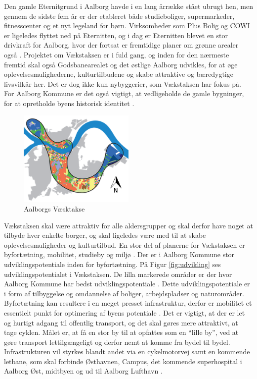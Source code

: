 \newline \indent{     }  Den gamle Eternitgrund i Aalborg havde i en lang årrække stået ubrugt hen, men gennem de sidste fem år er der etableret både studieboliger, supermarkeder, fitnesscenter og et nyt legeland for børn. Virksomheder som Plus Bolig og COWI er ligeledes flyttet ned på Eternitten, og i dag er Eternitten blevet en stor drivkraft for Aalborg,  hvor der fortsat  er fremtidige planer om grønne arealer også \citep{eternitten}.
\newline \indent{     }  Projektet om Vækstaksen er i fuld gang, og inden for den nærmeste fremtid skal også Godsbanearealet og det østlige Aalborg udvikles, for at øge oplevelsesmulighederne, kulturtilbudene og skabe attraktive og bæredygtige livsvilkår her. Det er dog ikke kun nybyggerier, som Vækstaksen har fokus på. For Aalborg Kommune er det også vigtigt, at vedligeholde de gamle bygninger, for at opretholde byens historisk identitet \citep{kommuneplan3}.

\begin{figure}[htbp]
	\centering
	\includegraphics[width=0.5\textwidth]{billeder/vaekstaksen.png}
	\caption{Aalborgs Væsktakse \citep{kommuneplan3}}
	\label{fig:vaekstakse}
\end{figure}

Vækstaksen skal være attraktiv for alle aldersgrupper og skal derfor have noget at tilbyde hver enkelte borger, og skal ligeledes være med til at skabe oplevelsesmuligheder og kulturtilbud.
\newline \indent{     }  En stor del af planerne for Vækstaksen er byfortætning, mobilitet, studieby og miljø \citep{kommuneplan3}. 
Der er i Aalborg Kommune stor udviklingspotentiale inden for byfortætning. På Figur \ref{fig:udvikling} ses udviklingspotentialet i Vækstaksen. De lilla markerede områder er der hvor Aalborg Kommune har bedst udviklingspotentiale \citep{kommuneplan3}.
\newline \indent{     }  Dette udviklingspotentiale er i form af tilbyggelse og omdannelse af boliger, arbejdspladser og naturområder. Byfortætning kan resultere i en meget presset infrastruktur, derfor er mobilitet et essentielt punkt for optimering af byens potentiale \citep{kommuneplan3}. Det er vigtigt, at der er let og hurtigt adgang til offentlig transport, og det skal gøres mere attraktivt, at tage cyklen. Målet er, at få en stor by til at opfattes som en “lille by”, ved at gøre transport lettilgængeligt og derfor nemt at komme fra bydel til bydel. Infrastrukturen vil styrkes blandt andet via en cykelmotorvej samt en kommende letbane, som skal forbinde Østhavnen, Campus, det kommende superhospital i Aalborg Øst, midtbyen og ud til Aalborg Lufthavn \citep{kommuneplan3}.

